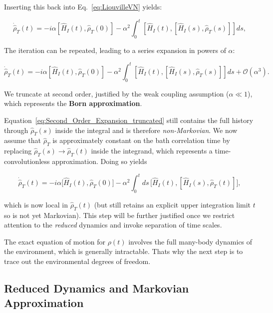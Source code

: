 \noindent
Inserting this back into Eq.~\eqref{eq:LiouvilleVN} yields:

\begin{equation}
	\dot{\hat{\rho}}_T(t) = -i \alpha \left[ \hat{H}_I(t), \hat{\rho}_T(0) \right]
	- \alpha^2 \int_0^t \left[ \hat{H}_I(t), \left[ \hat{H}_I(s), \hat{\rho}_T(s) \right] \right] ds,
	\label{eq:Second_Order_Expansion}
\end{equation}

\noindent
The iteration can be repeated, leading to a series expansion in powers of $\alpha$:

\begin{equation}
	\dot{\hat{\rho}}_T(t) = -i \alpha \left[ \hat{H}_I(t), \hat{\rho}_T(0) \right]
	- \alpha^2 \int_0^t \left[ \hat{H}_I(t), \left[ \hat{H}_I(s), \hat{\rho}_T(s) \right] \right] ds + \mathcal{O} (\alpha^3).
	\label{eq:Second_Order_Expansion_truncated}
\end{equation}

\noindent
We truncate at second order, justified by the weak coupling assumption ($\alpha \ll 1$), which represents the \textbf{Born approximation}.

\noindent
Equation~\eqref{eq:Second_Order_Expansion_truncated} still contains the full history through $\hat{\rho}_T(s)$ inside the integral and is therefore \emph{non-Markovian}. We now assume that $\hat{\rho}_T$ is approximately constant on the bath correlation time by replacing $\hat{\rho}_T(s) \to \hat{\rho}_T(t)$ inside the integrand, which represents a time-convolutionless approximation. Doing so yields

\begin{equation}
	\dot{\hat{\rho}}_T(t) = -i \alpha \big[ \hat{H}_I(t), \hat{\rho}_T(0) \big]
	- \alpha^2 \int_0^t ds\, \big[ \hat{H}_I(t), [ \hat{H}_I(s), \hat{\rho}_T(t)] \big],
	\label{eq:Second_Order_Expansion_wo_third}
\end{equation}

\noindent
which is now local in $\hat{\rho}_T(t)$ (but still retains an explicit upper integration limit $t$ so is not yet Markovian). This step will be further justified once we restrict attention to the \emph{reduced} dynamics and invoke separation of time scales.

\noindent
The exact equation of motion for $\rho(t)$ involves the full many-body dynamics of the environment, which is generally intractable. Thats why the next step is to trace out the environmental degrees of freedom.


\subsection{Reduced Dynamics and Markovian Approximation}

